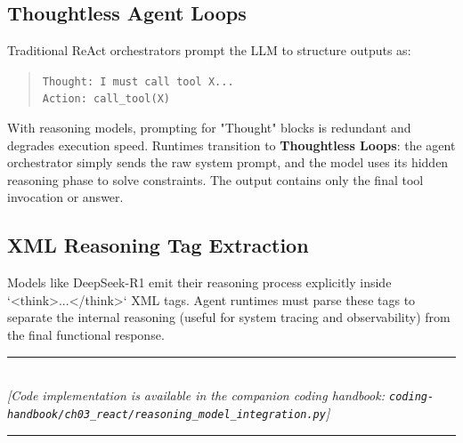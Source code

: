 \subsection{Thoughtless Agent Loops}
Traditional ReAct orchestrators prompt the LLM to structure outputs as:
\begin{quote}
\texttt{Thought: I must call tool X... \\ Action: call\_tool(X)}
\end{quote}
With reasoning models, prompting for "Thought" blocks is redundant and degrades execution speed. Runtimes transition to \textbf{Thoughtless Loops}: the agent orchestrator simply sends the raw system prompt, and the model uses its hidden reasoning phase to solve constraints. The output contains only the final tool invocation or answer.

\subsection{XML Reasoning Tag Extraction}
Models like DeepSeek-R1 emit their reasoning process explicitly inside `<think>...</think>` XML tags. Agent runtimes must parse these tags to separate the internal reasoning (useful for system tracing and observability) from the final functional response.

\begin{center}
\noindent\rule{0.6\textwidth}{0.4pt} \\
\vspace{0.3em}
\textit{[Code implementation is available in the companion coding handbook: \texttt{coding-handbook/ch03\_react/reasoning\_model\_integration.py}]} \\
\noindent\rule{0.6\textwidth}{0.4pt}
\end{center}

